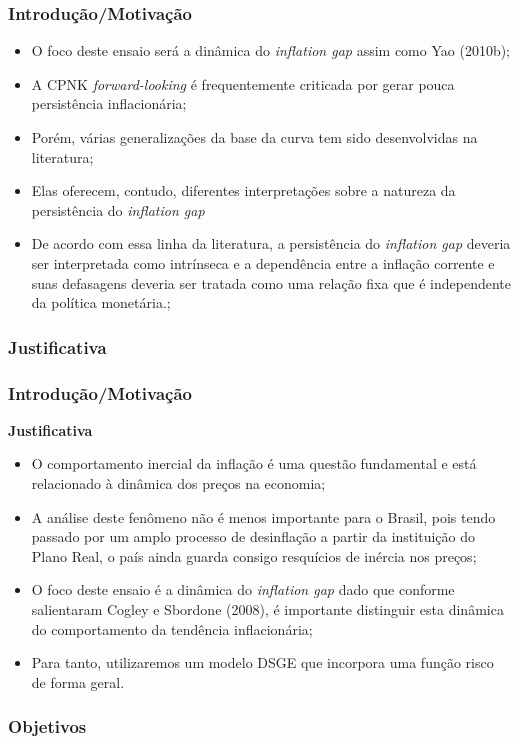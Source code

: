 \documentclass[aspectratio=169]{beamer}
\begin{document}
\begin{frame}\frametitle{Introdução/Motivação}
  \begin{itemize}
  \item O foco deste ensaio será a dinâmica do \emph{inflation gap} assim como Yao (2010b);
  \item A CPNK \emph{forward-looking} é frequentemente criticada por gerar pouca persistência inflacionária;
  \item Porém, várias generalizações da base da curva tem sido desenvolvidas na literatura;
  \item Elas oferecem, contudo, diferentes interpretações sobre a natureza da persistência do \emph{inflation gap}
  \item De acordo com essa linha da literatura, a persistência do \emph{inflation gap} deveria ser interpretada como intrínseca e a dependência entre a inflação corrente e suas defasagens deveria ser tratada como uma relação fixa que é independente da política monetária.;
  \end{itemize}
\end{frame}

\subsubsection{Justificativa}

\begin{frame}\frametitle{Introdução/Motivação}
\textbf{Justificativa}
\begin{itemize}
\item O comportamento inercial da inflação é uma questão fundamental e está relacionado à dinâmica dos preços na economia;
\item A análise deste fenômeno não é menos importante para o Brasil, pois tendo passado por um amplo processo de desinflação a partir da instituição do Plano Real, o país ainda guarda consigo resquícios de inércia nos preços;
\item O foco deste ensaio é a dinâmica do \emph{inflation gap} dado que conforme salientaram Cogley e Sbordone (2008), é importante distinguir esta dinâmica do comportamento da tendência inflacionária;
\item Para tanto, utilizaremos um modelo DSGE que incorpora uma função risco de forma geral.
\end{itemize}
\end{frame}

\subsubsection{Objetivos}
\end{document}
